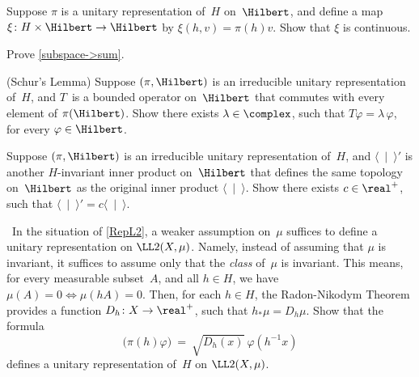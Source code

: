 \begin{exercises}


\item Suppose $\pi$ is a unitary representation of~$H$ on~$\Hilbert$, and define a map $\xi \colon H \times \Hilbert \to \Hilbert$ by $\xi(h,v) = \pi(h) v$. Show that $\xi$ is continuous.

\item \label{subspace->sumEx}
Prove \cref{subspace->sum}.

\item \label{SchursLemmaUnitary}
(Schur's Lemma)
Suppose $(\pi,\Hilbert)$ is an irreducible unitary representation of~$H$, and $T$~is a bounded operator on~$\Hilbert$ that commutes with every element of $\pi(\Hilbert)$.
Show there exists $\lambda \in \complex$, such that $T \varphi = \lambda \, \varphi$, for every $\varphi \in \Hilbert$.

\item Suppose $(\pi,\Hilbert)$ is an irreducible unitary representation of~$H$, and $\langle~\mid~\rangle'$ is another $H$-invariant inner product on~$\Hilbert$ that defines the same topology on~$\Hilbert$ as the original inner product $\langle~\mid~\rangle$. Show there exists $c \in \real^+$, such that $\langle~\mid~\rangle' = c \langle~\mid~\rangle$.
	

\item \label{RegRepNoInvtMeas}
\optional\ 
In the situation of \cref{RepL2}, a weaker assumption on~$\mu$ suffices to define a unitary representation on $\LL2(X,\mu)$. Namely, instead of assuming that $\mu$ is invariant, it suffices to assume only that the \emph{class} of~$\mu$ is invariant. This means, for every measurable subset~$A$, and all $h \in H$, we have $\mu(A) = 0 \Leftrightarrow \mu(hA) = 0$. Then, for each $h \in H$, the Radon-Nikodym Theorem  provides a function $D_h \colon X \to \real^+$, such that $h_* \mu = D_h \mu$. Show that the formula
	$$\bigl( \pi(h) \varphi \bigr) \  = \  \sqrt{D_h(x)} \  \varphi( h^{-1} x ) $$
defines a unitary representation of~$H$ on $\LL2(X,\mu)$.


\end{exercises}
